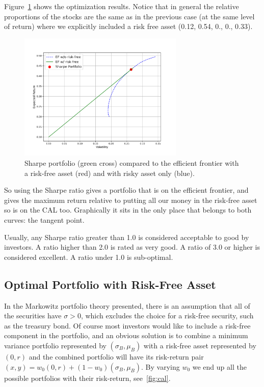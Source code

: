 Figure~\ref{fig:sharpe_ratio} shows the optimization results. Notice that in general the relative proportions of the stocks are the same as in the previous case (at the same level of return) where we explicitly included a risk free asset (0.12, 0.54, 0., 0., 0.33).

\begin{figure}[htb]
\centering
\includegraphics[width=0.7\textwidth]{figures/sharpe_ratio}
\caption{Sharpe portfolio (green cross) compared to the efficient frontier with a risk-free asset (red) and with risky asset only (blue).}
\label{fig:sharpe_ratio}
\end{figure}

So using the Sharpe ratio gives a portfolio that is on the efficient frontier, and gives the maximum return relative to putting all our money in the risk-free asset so is on the CAL too. Graphically it sits in the only place that belongs to both curves: the tangent point.

Usually, any Sharpe ratio greater than 1.0 is considered acceptable to good by investors. A ratio higher than 2.0 is rated as very good. A ratio of 3.0 or higher is considered excellent. A ratio under 1.0 is sub-optimal.

\subsection{Optimal Portfolio with Risk-Free Asset}

In the Markowitz portfolio theory presented, there is an assumption that all of the securities have $\sigma > 0$, which excludes the choice for a risk-free security, such as the treasury bond. Of course most investors would like to include a risk-free component in the portfolio, and an obvious solution is to combine a minimum variance portfolio represented by $(\sigma_B, \mu_B)$ with a risk-free asset represented by $(0, r)$ and the combined portfolio will have its risk-return pair $(x, y) = w_0(0, r) + (1-w_0)(\sigma_B, \mu_B)$.
By varying $w_0$ we end up all the possible portfolios with their risk-return, see~\ref{fig:cal}.

